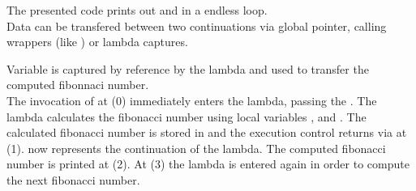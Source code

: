 The presented code prints out  and  in a endless loop.\\

Data can be transfered between two continuations via global pointer, calling
wrappers (like ) or lambda captures.

Variable  is captured by reference by the lambda and used to transfer
the computed fibonnaci number.\\
The invocation of \callcc at (0) immediately enters the lambda, passing the
\currcont. The lambda calculates the fibonacci number using local variables
,  and . The calculated fibonacci number is stored in
 and the execution control returns via \resume at (1).
 now represents the continuation of the lambda. The computed fibonacci
number is printed at (2). At (3) the lambda is entered again in order to compute
the next fibonacci number.
